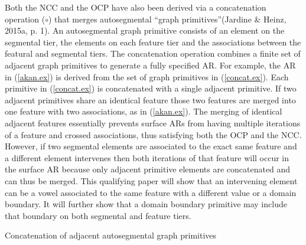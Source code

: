 \documentclass[,doc,floatsintext]{apa6}
\theoremstyle{definition}
\theoremstyle{definition}
\theoremstyle{definition}
\theoremstyle{remark}
\begin{document}
Both the NCC and the OCP have also been derived via a concatenation
operation (\(\circ\)) that merges autosegmental \enquote{graph
primitives}(Jardine \& Heinz, 2015a, p. 1). An autosegmental graph
primitive consists of an element on the segmental tier, the elements on
each feature tier and the associations between the featural and
segmental tiers. The concatenation operation combines a finite set of
adjacent graph primitives to generate a fully specified AR. For example,
the AR in (\ref{akan.ex}) is derived from the set of graph primitives in
(\ref{concat.ex}). Each primitive in (\ref{concat.ex}) is concatenated
with a single adjacent primitive. If two adjacent primitives share an
identical feature those two features are merged into one feature with
two associations, as in (\ref{akan.ex}). The merging of identical
adjacent features essentially prevents surface ARs from having multiple
iterations of a feature and crossed associations, thus satisfying both
the OCP and the NCC. However, if two segmental elements are associated
to the exact same feature and a different element intervenes then both
iterations of that feature will occur in the surface AR because only
adjacent primitive elements are concatenated and can thus be merged.
This qualifying paper will show that an intervening element can be a
vowel associated to the same feature with a different value or a domain
boundary. It will further show that a domain boundary primitive may
include that boundary on both segmental and feature tiers.

\begin{exe}
\ex \label{concat.ex} Concatenation of adjacent autosegmental graph primitives \\
\end{exe}
\end{document}
